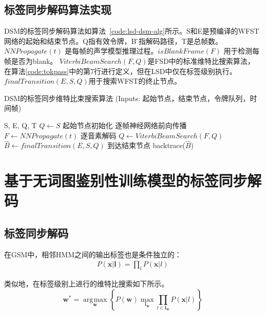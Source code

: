 \subsection{标签同步解码算法实现}
\label{chap:lsd-lsd-ctc-alg}

DSM的标签同步解码算法如算法~\ref{code:lsd-dsm-alg}所示。S和E是预编译的WFST网络的起始和结束节点。Q指有效令牌，B ̂指解码路径，T是总帧数。$NNPropagate(t)$ 是每帧的声学模型推理过程。$isBlankFrame(F)$ 用于检测每帧是否为blank。 $ViterbiBeamSearch(F, Q)$是FSD中的标准维特比搜索算法，在算法\ref{code:tokpass}中的第7行进行定义，但在LSD中仅在标签级别执行。  $finalTransition(E,S,Q)$用于搜索WFST的终止节点\cite{hori2007efficient}。


\begin{algorithm}[ht]
\caption{DSM的标签同步维特比束搜索算法 \textcolor[rgb]{0,0.5,0}{(Inputs: 起始节点，结束节点，令牌队列，时间帧)}}
\label{code:lsd-dsm-alg}
\begin{algorithmic}[1]
 {S, E, Q, T}
\State $Q \leftarrow S$ \Comment \textcolor[rgb]{0,0.5,0}{起始节点初始化}
    \Comment \textcolor[rgb]{0,0.5,0}{逐帧神经网络前向传播}
\State $F \leftarrow NNPropagate(t)$
   \Comment \textcolor[rgb]{0,0.5,0}{逐音素解码}
\State  $Q\leftarrow ViterbiBeamSearch(F, Q)$
\EndIf
\EndFor
\State $\hat B\leftarrow finalTransition(E,S,Q)$ \Comment \textcolor[rgb]{0,0.5,0}{到达结束节点}
\State backtrace($\hat B$)
\EndProcedure
\end{algorithmic}
\end{algorithm}


\section{基于无词图鉴别性训练模型的标签同步解码}
\label{chap:lsd-lfmmi}

\subsection{标签同步解码}
\label{chap:lsd-lsd-hmm}

在GSM中，相邻HMM之间的输出标签也是条件独立的：
\begin{equation} \label{eq:viterbi-blk-hmm}
  \begin{split}
        P(\mathbf{x}|\mathbf{l}) 
        = \prod_{l} P(\mathbf{x}|l) \end{split}
       \end{equation}

类似地，在标签级别上进行的维特比搜索如下所示。
\begin{equation} \label{eq:gsm-dec-lsd}
   \mathbf{w}^* = \mathop{\arg\!\max}\limits_\mathbf{w} \left\{
        P(\mathbf{w})
        \mathop{\max}\limits_{\mathbf{l}_\mathbf{w}}  \prod_{l\in\mathbf{l}_\mathbf{w}} P(\mathbf{x}|l)\right\}
     \end{equation}

